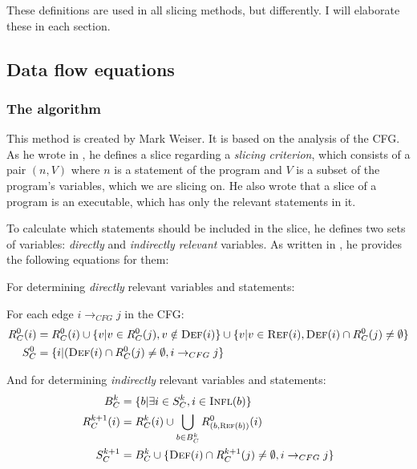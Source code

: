 \documentclass[oneside,12pt,a4paper]{book}
\begin{document}
These definitions are used in all slicing methods, but differently. I will elaborate these in each section.

\subsection{Data flow equations}
\subsubsection{The algorithm}
This method is created by Mark Weiser. It is based on the analysis of the CFG. As he wrote in \cite{weiser84}, he defines a slice regarding a \textit{slicing criterion}, which consists of a pair $(n, V)$ where $n$ is a statement of the program and $V$ is a subset of the program's variables, which we are slicing on. He also wrote that a slice of a program is an executable, which has only the relevant statements in it.

To calculate which statements should be included in the slice, he defines two sets of variables: \textit{directly} and \textit{indirectly relevant} variables. As written in \cite{slicing-survey}, he provides the following equations for them:

For determining \textit{directly} relevant variables and statements:

For each edge $i \rightarrow_{CFG} j$ in the CFG:
\begin{align*}
R^0_C(i) &= R^0_C(i) \cup \{ v | v \in R^0_C(j), v \notin \textsc{Def}(i) \} \cup \{ v | v \in \textsc{Ref}(i), \textsc{Def}(i) \cap R^0_C(j) \neq \emptyset \} \\
S^0_C &= \{ i | (\textsc{Def}(i) \cap R^0_C(j) \neq \emptyset, i \rightarrow_{CFG} j \}
\end{align*}

And for determining \textit{indirectly} relevant variables and statements:
\begin{align*}
B^k_C &= \{ b | \exists i \in S^k_C, i \in \textsc{Infl}(b) \} \\
R^{k+1}_C(i) &= R^k_C(i) \cup \bigcup_{b \in B^k_C} R^0_{(b, \textsc{Ref}(b))} (i) \ \\
S^{k+1}_C &= B^k_C \cup \{ \textsc{Def}(i) \cap R^{k+1}_C(j) \neq \emptyset, i \rightarrow_{CFG} j \} 
\end{align*}
\end{document}
